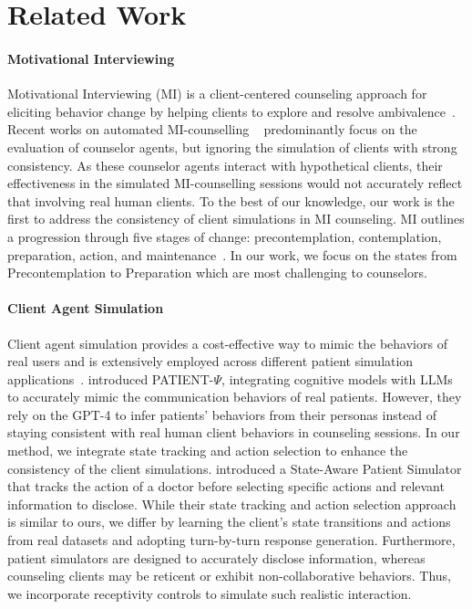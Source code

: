 \section{Related Work}

\paragraph{Motivational Interviewing}
Motivational Interviewing (MI) is a client-centered counseling approach for eliciting behavior change by helping clients to explore and resolve ambivalence~\citep{miller2012motivational}. Recent works on automated MI-counselling ~\citep{chiu2024computational,yosef2024assessing,wang2024towards} predominantly focus on the evaluation of counselor agents, but ignoring the simulation of clients with strong consistency. As these counselor agents interact with hypothetical clients, their effectiveness in the simulated MI-counselling sessions would not accurately reflect that involving real human clients. To the best of our knowledge, our work is the first to address the consistency of client simulations in MI counseling. MI outlines a progression through five stages of change: precontemplation, contemplation, preparation, action, and maintenance~\citep{prochaska1997transtheoretical,hashemzadeh2019transtheoretical}. In our work, we focus on the states from Precontemplation to Preparation which are most challenging to counselors.

\paragraph{Client Agent Simulation}
Client agent simulation provides a cost-effective way to mimic the behaviors of real users and is extensively employed across different patient simulation applications~\citep{wang2024patient}. \citet{wang2024patient} introduced PATIENT-$\Psi$, integrating cognitive models with LLMs to accurately mimic the communication behaviors of real patients. However, they rely on the GPT-4 to infer patients' behaviors from their personas instead of staying consistent with real human client behaviors in counseling sessions. In our method, we integrate state tracking and action selection to enhance the consistency of the client simulations. \citet{liao2024automatic} introduced a State-Aware Patient Simulator that tracks the action of a doctor before selecting specific actions and relevant information to disclose. While their state tracking and action selection approach is similar to ours, we differ by learning the client's state transitions and actions from real datasets and adopting turn-by-turn response generation. Furthermore, patient simulators are designed to accurately disclose information, whereas counseling clients may be reticent or exhibit non-collaborative behaviors. Thus, we incorporate receptivity controls to simulate such realistic interaction. 


